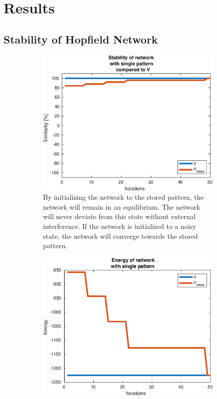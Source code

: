 \section{Results}

\subsection{Stability of Hopfield Network}
\begin{figure}[H]
    \centering
    \captionsetup[subfigure]{width=0.9\textwidth, justification=raggedright}
    \begin{subfigure}{0.49\textwidth}
        \includegraphics[width=\textwidth]{figs/stable}
        \caption{By initializing the network to the stored pattern, the network will remain in an equilibrium. The network will never deviate from this state without external interference. If the network is initialized to a noisy state, the network will converge towards the stored pattern.}
    \end{subfigure}
    \begin{subfigure}{0.49\textwidth}
        \includegraphics[width=\textwidth]{figs/stable-energy}

\end{subfigure}
\end{figure}
